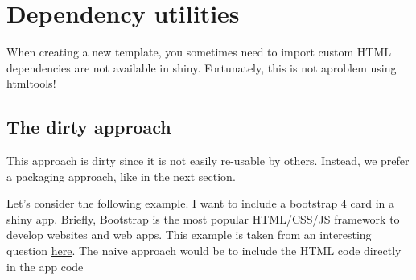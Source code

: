 \documentclass[
]{book}
\newenvironment{Shaded}{\begin{snugshade}}{\end{snugshade}}
\newcommand{\CommentTok}[1]{\textcolor[rgb]{0.56,0.35,0.01}{\textit{#1}}}
\newcommand{\ControlFlowTok}[1]{\textcolor[rgb]{0.13,0.29,0.53}{\textbf{#1}}}
\newcommand{\DecValTok}[1]{\textcolor[rgb]{0.00,0.00,0.81}{#1}}
\newcommand{\KeywordTok}[1]{\textcolor[rgb]{0.13,0.29,0.53}{\textbf{#1}}}
\newcommand{\NormalTok}[1]{#1}
\newcommand{\OperatorTok}[1]{\textcolor[rgb]{0.81,0.36,0.00}{\textbf{#1}}}
\newcommand{\StringTok}[1]{\textcolor[rgb]{0.31,0.60,0.02}{#1}}
\begin{document}
\begin{Shaded}
\end{Shaded}

\hypertarget{htmltools-dependencies}{%
\chapter{Dependency utilities}\label{htmltools-dependencies}}

When creating a new template, you sometimes need to import custom HTML dependencies
are not available in shiny. Fortunately, this is not aproblem using htmltools!

\hypertarget{the-dirty-approach}{%
\section{The dirty approach}\label{the-dirty-approach}}

This approach is dirty since it is not easily re-usable by others. Instead, we prefer a packaging approach, like in the next section.

Let's consider the following example. I want to include a bootstrap 4 card in a shiny app. Briefly, Bootstrap is the most popular HTML/CSS/JS framework to develop websites and web apps. This example is taken from an interesting question \href{https://community.rstudio.com/t/create-a-div-using-htmltools-withtags/22439/2}{here}.
The naive approach would be to include the HTML code directly in the app code
\end{document}
